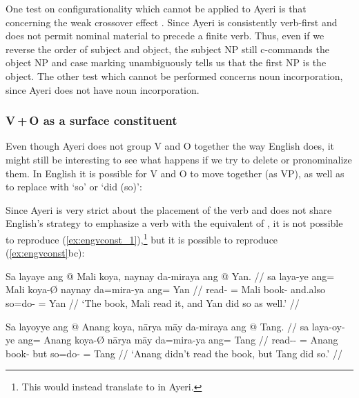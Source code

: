 One test on configurationality which cannot be applied to Ayeri is that
concerning the weak crossover effect \citep[133--135]{speas1990}. Since Ayeri
is consistently verb-first and does not permit nominal material to precede a
finite verb. Thus, even if we reverse the order of subject and object, the
subject NP still c-commands the object NP and case marking unambiguously tells
us that the first NP is the object. The other test which cannot be performed
concerns noun incorporation, since Ayeri does not have noun incorporation.

\subsubsection{V\,+\,O as a surface constituent}

Even though Ayeri does not group V and O together the way English does, it
might still be interesting to see what happens if we try to delete or
pronominalize them. In English it is possible for V and O to move together (as
VP), as well as to replace  with `so' or `did (so)':

\pex\label{ex:engvconst}
\a\label{ex:engvconst_1} 
\a\label{ex:engvconst_2} 
\a\label{ex:engvconst_3} 
\xe

Since Ayeri is very strict about the placement of the verb and does not share
English's strategy to emphasize a verb with the equivalent of , it is
not possible to reproduce (\ref{ex:engvconst_1}),\footnote{This would instead
translate to  in Ayeri.} but it is possible to reproduce 
(\ref{ex:engvconst}bc):

\pex\label{ex:ayrvconst1}
\a\label{ex:ayrvconst1_1}\begingl
	\gla Sa layaye ang @ Mali koya, naynay da-miraya ang @ Yan. //
	\glb sa laya-ye ang= Mali koya-Ø naynay da=mira-ya ang= Yan //
	\glc \PatT{} read-\TsgF{} \Aarg{}= Mali book-\Top{} and.also so=do-\TsgM{}
		\Aarg{}= Yan //
	\glft `The book, Mali read it, and Yan did so as well.' //
\endgl

\a\label{ex:ayrvconst1_2}\begingl
	\gla Sa layoyye ang @ Anang koya, nārya māy da-miraya ang @ Tang. //
	\glb sa laya-oy-ye ang= Anang koya-Ø nārya māy da=mira-ya ang= Tang //
	\glc \PatT{} read-\Neg{}-\TsgF{} \Aarg{}= Anang book-\Top{} but \Aff{}
		so=do-\TsgM{} \Aarg{}= Tang //
	\glft `Anang didn't read the book, but Tang did so.' //
\endgl

